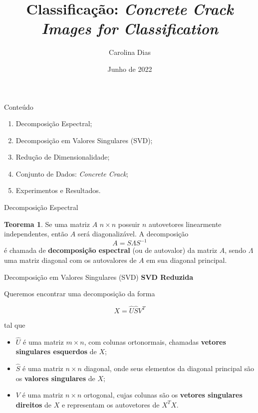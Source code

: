 \documentclass{beamer}
\title{Classificação: \textit{Concrete Crack Images for Classification}}
\author{Carolina Dias}
\date{Junho de 2022}
\theoremstyle{definition}
\newtheorem{teorema}{Teorema}
\begin{document}
\maketitle

\begin{frame}{Conteúdo}
\begin{enumerate}
    \item Decomposição Espectral;
    \item Decomposição em Valores Singulares (SVD);
    \item Redução de Dimensionalidade;
    \item Conjunto de Dados: \textit{Concrete Crack};
    \item Experimentos e Resultados.
\end{enumerate}
\end{frame}


\begin{frame}{Decomposição Espectral}

\begin{teorema}
    Se uma matriz $A$ $n \times n$ possuir $n$ autovetores linearmente independentes, então $A$ será diagonalizável. A decomposição $$A = S\Lambda S^{-1}$$ é chamada de \textbf{decomposição espectral} (ou de autovalor) da matriz $A$, sendo $\Lambda$ uma matriz diagonal com os autovalores de $A$ em sua diagonal principal.
\end{teorema}
\end{frame}

\begin{frame}{Decomposição em Valores Singulares (SVD)}
    \textbf{SVD Reduzida}
    
    Queremos encontrar uma decomposição da forma

$$X = \hat{U}\hat{S}V^T$$

tal que

\begin{itemize}
    \item $\hat{U}$ é uma matriz $m \times n$, com colunas ortonormais, chamadas \textbf{vetores singulares esquerdos} de $X$;
    \item $\hat{S}$ é uma matriz $n \times n$ diagonal, onde seus elementos da diagonal principal são os \textbf{valores singulares} de $X$;
    \item $V$ é uma matriz $n \times n$ ortogonal, cujas colunas são os \textbf{vetores singulares direitos} de $X$ e representam os autovetores de $X^TX$.
\end{itemize}
\end{frame}
\end{document}
